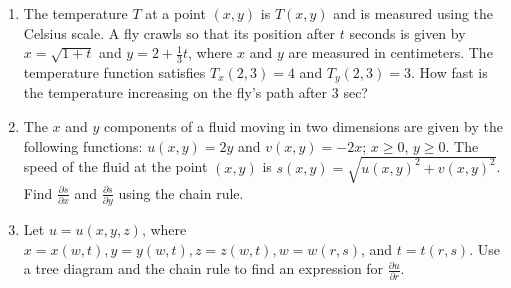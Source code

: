 \documentclass{exercises}
\begin{document}
\begin{enumerate}[resume]
\item The temperature $T$ at a point $(x,y)$ is $T(x,y)$ and is measured using the Celsius scale. A fly crawls so that its position after $t$ seconds is given by $x=\sqrt{1+t}$ and $y=2+\frac{1}{3}t$, where $x$ and $y$ are measured in centimeters. The temperature function satisfies $T_{x}(2,3)=4$ and $T_{y}(2,3)=3$. How fast is the temperature increasing on the fly's path after $3$ sec?
\item The $x$ and $y$ components of a fluid moving in two dimensions are given by the following functions: $u(x,y)=2y$ and $v(x,y)=-2x$; $x\ge0$, $y\ge0$. The speed of the fluid at the point $(x,y)$ is $s(x,y)=\sqrt{u(x,y)^{2}+v(x,y)^{2}}$. Find $\frac{\partial s}{\partial x}$ and $\frac{\partial s}{\partial y}$ using the chain rule.
\item Let $u=u(x,y,z)$, where $x=x(w,t),y=y(w,t),z=z(w,t),w=w(r,s)$, and $t=t(r,s)$. Use a tree diagram and the chain rule to find an expression for $\frac{\partial u}{\partial r}$.
\end{enumerate}
\end{document}
